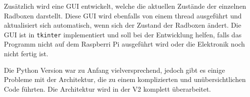 \bigskip

\noindent Zusätzlich wird eine \ac{GUI} entwickelt, welche die aktuellen Zustände der einzelnen Radboxen darstellt. Diese \ac{GUI} wird ebenfalls von einem \Gls{thread} ausgeführt und aktualisiert sich automatisch, wenn sich der Zustand der Radboxen ändert. Die \ac{GUI} ist in \texttt{tkinter} implementiert und soll bei der Entwicklung helfen, falls das Programm nicht auf dem Raspberri Pi ausgeführt wird oder die Elektronik noch nicht fertig ist.

\bigskip

\noindent Die Python Version war zu Anfang vielversprechend, jedoch gibt es einige Probleme mit der Architektur, die zu einem komplizierten und unübersichtlichen Code führten. Die Architektur wird in der V2 komplett überarbeitet.
